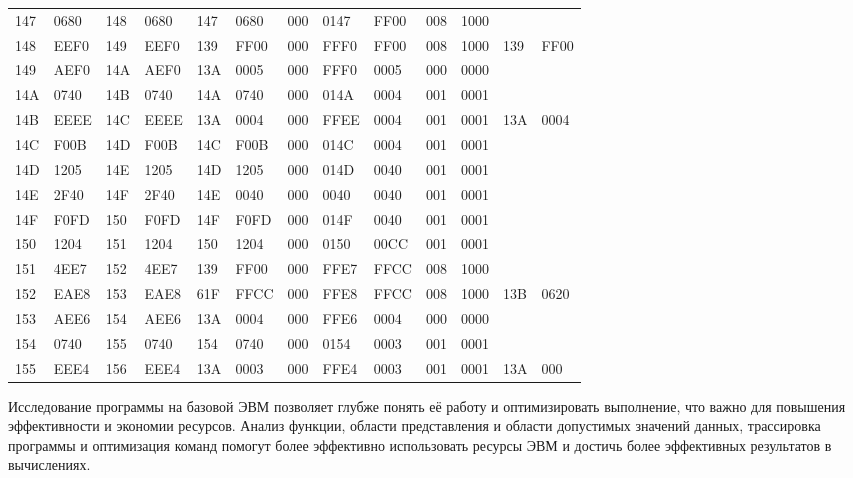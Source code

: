 \documentclass[14pt]{extreport}
\begin{document}
\begin{landscape}
\begin{tabular}{|l|l|l|l|l|l|l|l|l|l|l|l|l|}
                    \hline
                \end{tabular}
                \newpage
                \begin{tabular}{|l|l|l|l|l|l|l|l|l|l|l|l|l|}
                    \hline
                    147 & 0680 & 148 & 0680 & 147 & 0680 & 000 & 0147 & FF00 & 008 & 1000 &&\\
                    148 & EEF0 & 149 & EEF0 & 139 & FF00 & 000 & FFF0 & FF00 & 008 & 1000 & 139 & FF00 \\
                    149 & AEF0 & 14A & AEF0 & 13A & 0005 & 000 & FFF0 & 0005 & 000 & 0000 &&\\
                    14A & 0740 & 14B & 0740 & 14A & 0740 & 000 & 014A & 0004 & 001 & 0001 &&\\
                    14B & EEEE & 14C & EEEE & 13A & 0004 & 000 & FFEE & 0004 & 001 & 0001 & 13A & 0004 \\
                    14C & F00B & 14D & F00B & 14C & F00B & 000 & 014C & 0004 & 001 & 0001 &&\\
                    14D & 1205 & 14E & 1205 & 14D & 1205 & 000 & 014D & 0040 & 001 & 0001 &&\\
                    14E & 2F40 & 14F & 2F40 & 14E & 0040 & 000 & 0040 & 0040 & 001 & 0001 &&\\
                    14F & F0FD & 150 & F0FD & 14F & F0FD & 000 & 014F & 0040 & 001 & 0001 &&\\
                    150 & 1204 & 151 & 1204 & 150 & 1204 & 000 & 0150 & 00CC & 001 & 0001 &&\\
                    151 & 4EE7 & 152 & 4EE7 & 139 & FF00 & 000 & FFE7 & FFCC & 008 & 1000 &&\\
                    152 & EAE8 & 153 & EAE8 & 61F & FFCC & 000 & FFE8 & FFCC & 008 & 1000 & 13B & 0620 \\
                    153 & AEE6 & 154 & AEE6 & 13A & 0004 & 000 & FFE6 & 0004 & 000 & 0000 &&\\
                    154 & 0740 & 155 & 0740 & 154 & 0740 & 000 & 0154 & 0003 & 001 & 0001 &&\\
                    155 & EEE4 & 156 & EEE4 & 13A & 0003 & 000 & FFE4 & 0003 & 001 & 0001 & 13A & 000 \\
                    \hline
                \end{tabular}
        \end{landscape}


    \conclusions Исследование программы на базовой ЭВМ позволяет глубже понять её работу и оптимизировать выполнение, что важно для повышения эффективности и экономии ресурсов. Анализ функции, области представления и области допустимых значений данных, трассировка программы и оптимизация команд помогут более эффективно использовать ресурсы ЭВМ и достичь более эффективных результатов в вычислениях.
\end{document}

